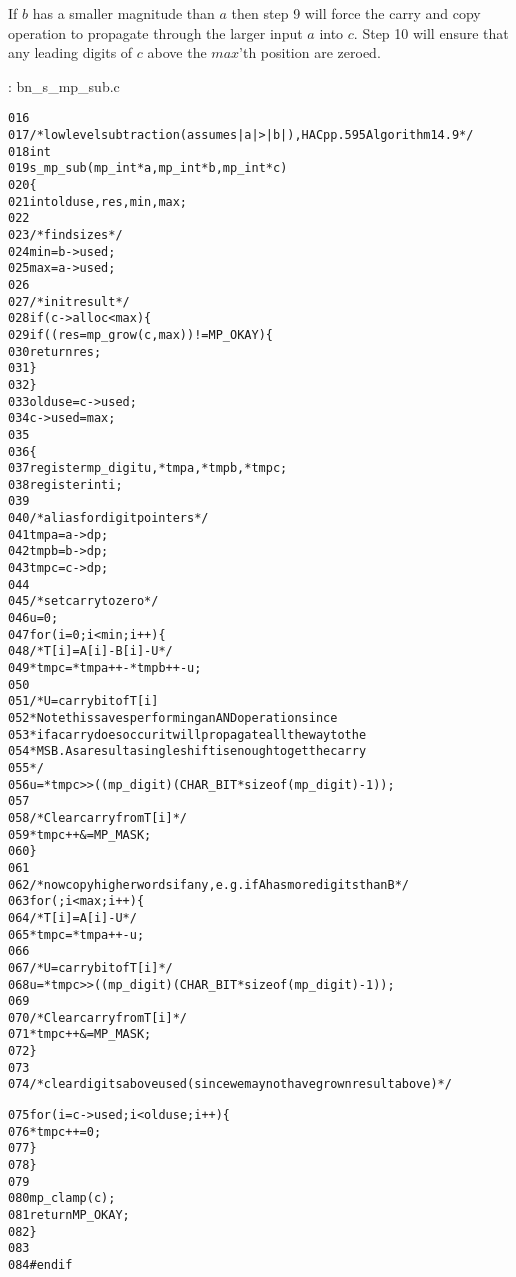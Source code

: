\documentclass[b5paper]{book}
\begin{document}
If $b$ has a smaller magnitude than $a$ then step 9 will force the carry and copy operation to propagate through the larger input $a$ into $c$.  Step
10 will ensure that any leading digits of $c$ above the $max$'th position are zeroed.

\vspace{+3mm}\begin{small}
\hspace{-5.1mm}{\bf File}: bn\_s\_mp\_sub.c
\vspace{-3mm}
\begin{alltt}
016   
017   /* low level subtraction (assumes |a| > |b|), HAC pp.595 Algorithm 14.9 */
018   int
019   s_mp_sub (mp_int * a, mp_int * b, mp_int * c)
020   \{
021     int     olduse, res, min, max;
022   
023     /* find sizes */
024     min = b->used;
025     max = a->used;
026   
027     /* init result */
028     if (c->alloc < max) \{
029       if ((res = mp_grow (c, max)) != MP_OKAY) \{
030         return res;
031       \}
032     \}
033     olduse = c->used;
034     c->used = max;
035   
036     \{
037       register mp_digit u, *tmpa, *tmpb, *tmpc;
038       register int i;
039   
040       /* alias for digit pointers */
041       tmpa = a->dp;
042       tmpb = b->dp;
043       tmpc = c->dp;
044   
045       /* set carry to zero */
046       u = 0;
047       for (i = 0; i < min; i++) \{
048         /* T[i] = A[i] - B[i] - U */
049         *tmpc = *tmpa++ - *tmpb++ - u;
050   
051         /* U = carry bit of T[i]
052          * Note this saves performing an AND operation since
053          * if a carry does occur it will propagate all the way to the
054          * MSB.  As a result a single shift is enough to get the carry
055          */
056         u = *tmpc >> ((mp_digit)(CHAR_BIT * sizeof (mp_digit) - 1));
057   
058         /* Clear carry from T[i] */
059         *tmpc++ &= MP_MASK;
060       \}
061   
062       /* now copy higher words if any, e.g. if A has more digits than B  */
063       for (; i < max; i++) \{
064         /* T[i] = A[i] - U */
065         *tmpc = *tmpa++ - u;
066   
067         /* U = carry bit of T[i] */
068         u = *tmpc >> ((mp_digit)(CHAR_BIT * sizeof (mp_digit) - 1));
069   
070         /* Clear carry from T[i] */
071         *tmpc++ &= MP_MASK;
072       \}
073   
074       /* clear digits above used (since we may not have grown result above) */
      
075       for (i = c->used; i < olduse; i++) \{
076         *tmpc++ = 0;
077       \}
078     \}
079   
080     mp_clamp (c);
081     return MP_OKAY;
082   \}
083   
084   #endif
\end{alltt}
\end{small}
\end{document}
